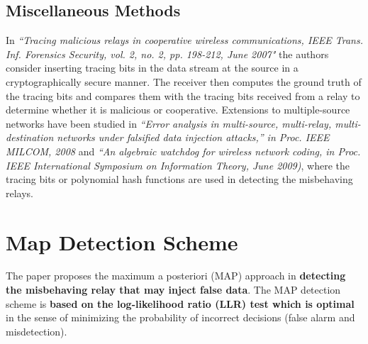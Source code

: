 \documentclass[conference]{IEEEtran}
\begin{document}
\subsection{Miscellaneous Methods}
In \textit{“Tracing malicious relays in cooperative wireless communications, IEEE Trans. Inf. Forensics Security, vol. 2, no. 2, pp. 198-212, June 2007"} the authors consider inserting tracing bits in the data stream at the source in a cryptographically secure manner. The receiver then computes the ground truth of the tracing bits and compares them with the tracing bits received from a relay to determine whether it is malicious or cooperative.\newline
Extensions to multiple-source networks have been studied in \textit{“Error analysis in multi-source, multi-relay, multi-destination networks under falsified data injection attacks,” in Proc. IEEE MILCOM, 2008} and \textit{“An algebraic watchdog for wireless network coding, in Proc. IEEE International Symposium on Information Theory, June 2009)}, where the tracing bits or polynomial hash functions are used in detecting the misbehaving relays.

\section{Map Detection Scheme}
The paper proposes the maximum a posteriori (MAP) approach in \textbf{detecting the misbehaving relay that may inject false data}. The MAP detection scheme is \textbf{based on the log-likelihood ratio (LLR) test which is optimal} in the sense of minimizing the probability of incorrect decisions (false alarm and misdetection).
\end{document}
